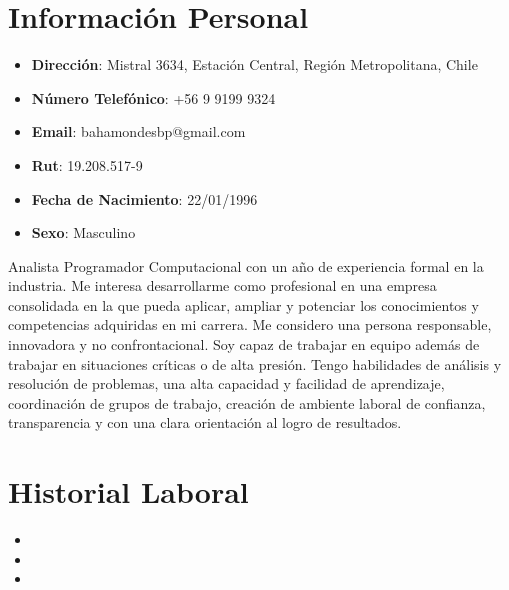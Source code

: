 \documentclass[11pt,a4paper,roman]{moderncv}        %
\begin{document}
\makecvtitle
\vspace*{-10mm}

\section{Información Personal}

\begin{itemize}

\item{\textbf{Dirección}: Mistral 3634, Estación Central, Región Metropolitana, Chile}

\item{\textbf{Número Telefónico}: +56 9 9199 9324}

\item{\textbf{Email}: bahamondesbp@gmail.com}

\item{\textbf{Rut}: 19.208.517-9}

\item{\textbf{Fecha de Nacimiento}: 22/01/1996}

\item{\textbf{Sexo}: Masculino}\\

\end{itemize}

\small{ Analista Programador Computacional con un año de experiencia formal en la industria. Me interesa desarrollarme como profesional en una
empresa consolidada en la que pueda aplicar, ampliar y potenciar los conocimientos y competencias adquiridas en mi carrera. Me considero una
persona responsable, innovadora y no confrontacional. Soy capaz de trabajar en equipo además de trabajar en situaciones críticas o de alta presión.
Tengo habilidades de análisis y resolución de problemas, una alta capacidad y facilidad de aprendizaje, coordinación de grupos de trabajo, creación
de ambiente laboral de confianza, transparencia y con una clara orientación al logro de resultados.}


\section{Historial Laboral}
\begin{itemize}
\item{}
\vspace{3pt}
\item{}
\vspace{3pt}
\item{}
\end{itemize}
\end{document}
